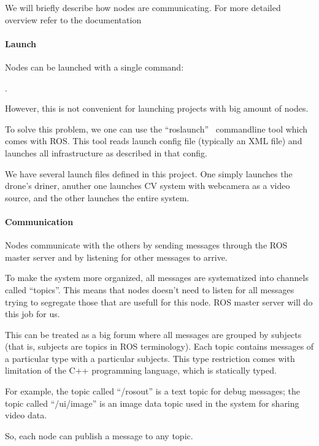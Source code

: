 \documentclass[11pt]{article}
\begin{document}
    We will briefly describe how nodes are communicating.
    For more detailed overview refer to the documentation~\cite{ROSsite, ArdroneAuthonomy, roslaunch, rostopic}

    \paragraph{Launch} Nodes can be launched with a single command:

    .

    However, this is not convenient for launching projects with big
    amount of nodes.

    To solve this problem, we one can use the ``roslaunch''~\cite{roslaunch} commandline tool
    which comes with ROS. This tool reads launch config file (typically an
    XML file) and launches all infrastructure as described in that config.

    We have several launch files defined in this project. One simply
    launches the drone's driner, anuther one launches CV system with
    webcamera as a video source, and the other launches the entire system.

    \paragraph{Communication} Nodes communicate with the others by sending messages
    through the ROS master server and by listening for other messages
    to arrive.

    To make the system more organized, all messages are systematized into
    channels called ``topics''. This means that nodes doesn't need to listen
    for all messages trying to segregate those that are usefull for this node.
    ROS master server will do this job for us.

    This can be treated as a big forum where all messages are grouped
    by subjects (that is, subjects are topics in ROS terminology).
    Each topic contains messages of a particular type
    with a particular subjects. This type restriction comes with limitation of
    the C++ programming language, which is statically typed.

    For example, the topic called ``/rosout'' is a text topic for debug
    messages; the topic called ``/ui/image'' is an image data topic used
    in the system for sharing video data.

    So, each node can publish a message to any topic.
\end{document}
